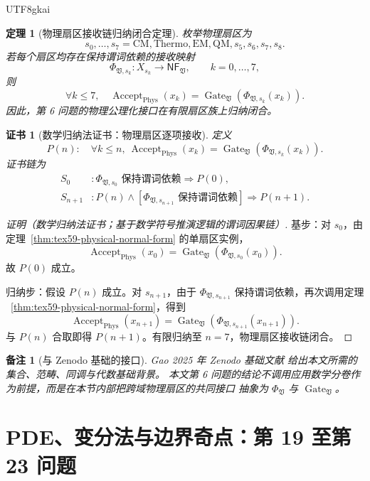 \documentclass[12pt]{article}
\newtheorem{theorem}{定理}[section]
\newtheorem{remark}{备注}[section]
\newtheorem{Certificate}{证书}[section]
\newcommand{\Vsys}{\mathfrak V}
\newcommand{\NF}{\mathsf{NF}}
\DeclareMathOperator{\Accept}{Accept}
\DeclareMathOperator{\Gate}{Gate}
\DeclareMathOperator{\Phys}{Phys}
\begin{document}
\begin{CJK*}{UTF8}{gkai}
\begin{theorem}[物理扇区接收链归纳闭合定理]
\label{thm:tex59-physics-sector-induction}
枚举物理扇区为
\[
  s_0,\ldots,s_7
  =
  \mathrm{CM},\mathrm{Thermo},\mathrm{EM},\mathrm{QM},
  s_5,s_6,s_7,s_8.
\]
若每个扇区均存在保持谓词依赖的接收映射
\[
  \Phi_{\Vsys,s_k}:X_{s_k}\to\NF_{\Vsys},
  \qquad k=0,\ldots,7,
\]
则
\[
  \forall k\le7,\quad
  \Accept_{\Phys}(x_k)=\Gate_{\Vsys}(\Phi_{\Vsys,s_k}(x_k)).
\]
因此，第 6 问题的物理公理化接口在有限扇区族上归纳闭合。
\end{theorem}

\begin{Certificate}[数学归纳法证书：物理扇区逐项接收]
\label{cert:tex59-physics-sector-induction}
定义
\[
  P(n):\quad
  \forall k\le n,\ 
  \Accept_{\Phys}(x_k)=\Gate_{\Vsys}(\Phi_{\Vsys,s_k}(x_k)).
\]
证书链为
\[
\begin{aligned}
  S_0 &: \Phi_{\Vsys,s_0}\text{ 保持谓词依赖}\Rightarrow P(0),\\
  S_{n+1} &: P(n)\wedge
  \left[
  \Phi_{\Vsys,s_{n+1}}\text{ 保持谓词依赖}
  \right]
  \Rightarrow P(n+1).
\end{aligned}
\]
\end{Certificate}

\begin{proof}[证明（数学归纳法证书；基于数学符号推演逻辑的谓词因果链）]
基步：对 \(s_0\)，由定理~\ref{thm:tex59-physical-normal-form} 的单扇区实例，
\[
  \Accept_{\Phys}(x_0)=\Gate_{\Vsys}(\Phi_{\Vsys,s_0}(x_0)).
\]
故 \(P(0)\) 成立。

归纳步：假设 \(P(n)\) 成立。对 \(s_{n+1}\)，由于
\(\Phi_{\Vsys,s_{n+1}}\) 保持谓词依赖，再次调用定理
~\ref{thm:tex59-physical-normal-form}，得到
\[
  \Accept_{\Phys}(x_{n+1})
  =
  \Gate_{\Vsys}(\Phi_{\Vsys,s_{n+1}}(x_{n+1})).
\]
与 \(P(n)\) 合取即得 \(P(n+1)\)。有限归纳至 \(n=7\)，物理扇区接收链闭合。
\end{proof}

\begin{remark}[与 Zenodo 基础的接口]
Gao 2025 年 Zenodo 基础文献 \cite{Gao2025PureMathZenodo}
给出本文所需的集合、范畴、同调与代数基础背景。
本文第 6 问题的结论不调用应用数学分卷作为前提，而是在本节内部把跨域物理扇区的共同接口
抽象为 \(\Phi_{\Vsys}\) 与 \(\Gate_{\Vsys}\)。
\end{remark}

\section{PDE、变分法与边界奇点：第 19 至第 23 问题}
\label{sec:tex59-pde}


\end{CJK*}
\end{document}

